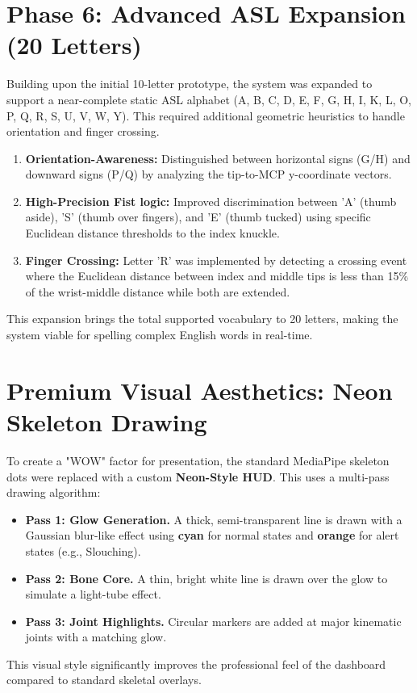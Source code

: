 \documentclass[a4paper,12pt]{report}
\begin{document}
\section{Phase 6: Advanced ASL Expansion (20 Letters)}
Building upon the initial 10-letter prototype, the system was expanded to support a near-complete static ASL alphabet (A, B, C, D, E, F, G, H, I, K, L, O, P, Q, R, S, U, V, W, Y). This required additional geometric heuristics to handle orientation and finger crossing.

\begin{enumerate}
    \item \textbf{Orientation-Awareness:} Distinguished between horizontal signs (G/H) and downward signs (P/Q) by analyzing the tip-to-MCP y-coordinate vectors.
    \item \textbf{High-Precision Fist logic:} Improved discrimination between 'A' (thumb aside), 'S' (thumb over fingers), and 'E' (thumb tucked) using specific Euclidean distance thresholds to the index knuckle.
    \item \textbf{Finger Crossing:} Letter 'R' was implemented by detecting a crossing event where the Euclidean distance between index and middle tips is less than 15\% of the wrist-middle distance while both are extended.
\end{enumerate}

This expansion brings the total supported vocabulary to 20 letters, making the system viable for spelling complex English words in real-time.

\section{Premium Visual Aesthetics: Neon Skeleton Drawing}
To create a "WOW" factor for presentation, the standard MediaPipe skeleton dots were replaced with a custom \textbf{Neon-Style HUD}. This uses a multi-pass drawing algorithm:
\begin{itemize}
    \item \textbf{Pass 1: Glow Generation.} A thick, semi-transparent line is drawn with a Gaussian blur-like effect using \textbf{cyan} for normal states and \textbf{orange} for alert states (e.g., Slouching).
    \item \textbf{Pass 2: Bone Core.} A thin, bright white line is drawn over the glow to simulate a light-tube effect.
    \item \textbf{Pass 3: Joint Highlights.} Circular markers are added at major kinematic joints with a matching glow.
\end{itemize}
This visual style significantly improves the professional feel of the dashboard compared to standard skeletal overlays.

\newpage
{}


\end{document}
